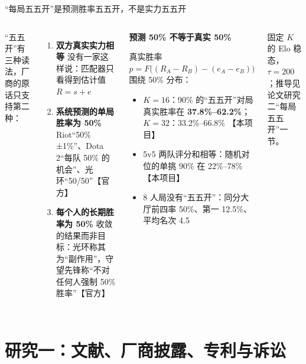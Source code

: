 \documentclass[aspectratio=169,11pt]{beamer}
\newcommand{\footsec}{}
\newcommand{\setfootsec}[1]{\renewcommand{\footsec}{#1}}
\newcommand{\evtag}[2]{\mbox{\textcolor{#1}{\scriptsize【#2】}}}
\newcommand{\tagOff}{\evtag{cAqua}{官方}}
\newcommand{\tagOwn}{\evtag{cRed}{本项目}}
\newcommand{\param}[1]{\par{\scriptsize\color{inkMuted}#1\par}}
\newcommand{\tightlist}{\setlength{\itemsep}{2pt}\setlength{\parskip}{0pt}}
\newcommand{\looselist}{\setlength{\itemsep}{4pt}\setlength{\parskip}{0pt}}
\begin{document}
\begin{frame}{“每局五五开”是预测胜率五五开，不是实力五五开}
\begin{columns}[T,onlytextwidth]
\small
“五五开”有三种读法，厂商的原话只支持第二种：
\begin{enumerate}\looselist
  \item[\textcolor{cRed}{\ding{55}}] \textbf{双方真实实力相等}\newline
    {\footnotesize\color{inkMuted}没有一家这样说：匹配器只看得到估计值 $R=s+e$}
  \item[\textcolor{cAqua}{\ding{51}}] \textbf{系统预测的单局胜率为 50\%}\newline
    {\footnotesize\color{inkMuted}Riot“50\%±1\%”、Dota 2“每队 50\% 的机会”、光环“50/50”}\tagOff
  \item[\textcolor{cRed}{\ding{55}}] \textbf{每个人的长期胜率为 50\%}\newline
    {\footnotesize\color{inkMuted}收敛的结果而非目标：光环称其为“副作用”，守望先锋称“不对任何人强制 50\% 胜率”}\tagOff
\end{enumerate}
\begin{notebox}
\footnotesize
\textbf{预测 50\% 不等于真实 50\%}\par\smallskip
真实胜率 $p=F\big((R_A-R_B)-(e_A-e_B)\big)$ 围绕 50\% 分布：
\begin{itemize}\tightlist
  \item $K=16$：90\% 的“五五开”对局真实胜率在 \textbf{37.8\%–62.2\%}；$K=32$：33.2\%–66.8\% \tagOwn
  \item 5v5 两队评分和相等：随机对位的单挑 90\% 在 22\%–78\% \tagOwn
  \item 8 人局没有“五五开”：同分大厅前四率 50\%、第一 12.5\%、平均名次 4.5
\end{itemize}
\end{notebox}
\param{固定 $K$ 的 Elo 稳态，$\tau=200$；推导见论文研究二“每局五五开”一节。}
\end{columns}
\end{frame}

\setfootsec{研究一\quad 文献、厂商披露、专利与诉讼}
\section{研究一：文献、厂商披露、专利与诉讼}
\end{document}
